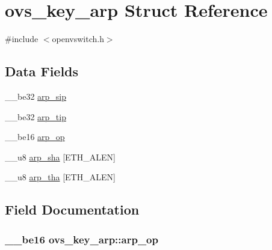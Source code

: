 \hypertarget{structovs__key__arp}{}\section{ovs\+\_\+key\+\_\+arp Struct Reference}
\label{structovs__key__arp}


{\ttfamily \#include $<$openvswitch.\+h$>$}

\subsection*{Data Fields}
\begin{DoxyCompactItemize}
\item 
\+\_\+\+\_\+be32 \hyperlink{structovs__key__arp_a25ce3912d909430a080dd3264d858892}{arp\+\_\+sip}
\item 
\+\_\+\+\_\+be32 \hyperlink{structovs__key__arp_a84a3d1edd8ba5960d41a69155e721d20}{arp\+\_\+tip}
\item 
\+\_\+\+\_\+be16 \hyperlink{structovs__key__arp_a560ecc1caa0ae74b43abe0d5dd30306d}{arp\+\_\+op}
\item 
\+\_\+\+\_\+u8 \hyperlink{structovs__key__arp_a99f6141da2e3151181663f27ab1a3560}{arp\+\_\+sha} \mbox{[}E\+T\+H\+\_\+\+A\+L\+E\+N\mbox{]}
\item 
\+\_\+\+\_\+u8 \hyperlink{structovs__key__arp_ab9f27ebc29aee381031d9b89d1b954ac}{arp\+\_\+tha} \mbox{[}E\+T\+H\+\_\+\+A\+L\+E\+N\mbox{]}
\end{DoxyCompactItemize}


\subsection{Field Documentation}
\hypertarget{structovs__key__arp_a560ecc1caa0ae74b43abe0d5dd30306d}{}
\subsubsection[{arp\+\_\+op}]{\setlength{\rightskip}{0pt plus 5cm}\+\_\+\+\_\+be16 ovs\+\_\+key\+\_\+arp\+::arp\+\_\+op}\label{structovs__key__arp_a560ecc1caa0ae74b43abe0d5dd30306d}
\hypertarget{structovs__key__arp_a99f6141da2e3151181663f27ab1a3560}{}

